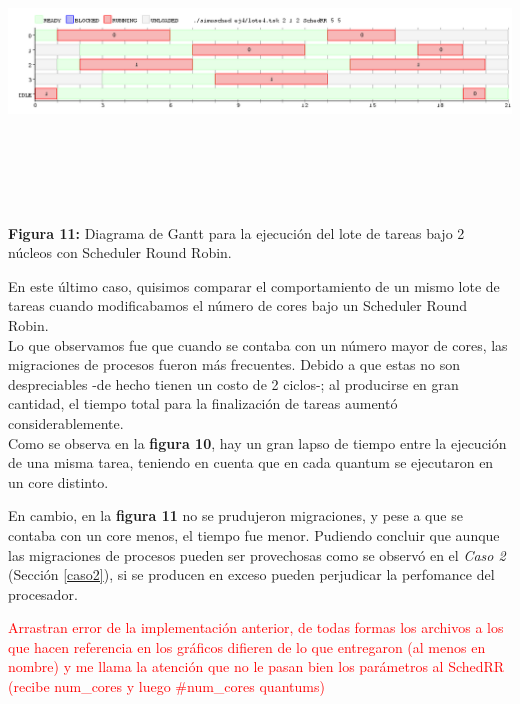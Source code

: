 \documentclass[a4paper]{article}
\begin{document}
 \includegraphics[width=\textwidth,height=3.0in,keepaspectratio]{imagenes/ej4/eje6.png} \\
\begin {flushleft}
\textbf{Figura 11:} Diagrama de Gantt para la ejecuci\'on del lote de tareas bajo 2 n\'ucleos con Scheduler Round Robin.
\end{flushleft}
 
\bigskip 

En este último caso, quisimos comparar el comportamiento de un mismo lote de tareas cuando modificabamos el número de cores bajo un Scheduler Round Robin.\\

 Lo que observamos fue que cuando se contaba con un número mayor de cores, las migraciones de procesos fueron m\'as frecuentes. Debido a que estas no son despreciables -de hecho tienen un costo de 2 ciclos-; al producirse en gran cantidad, el tiempo total para la finalización de tareas aumentó considerablemente. \\
 
 Como se observa en la \textbf{figura 10}, hay un gran lapso de tiempo entre la ejecución de una misma tarea, teniendo en cuenta que en cada quantum se ejecutaron en un core distinto. 
 
 En cambio, en la \textbf{figura 11} no se prudujeron migraciones, y pese a que se contaba con un core menos, el tiempo fue menor. Pudiendo concluir que aunque las migraciones de procesos pueden ser provechosas como se observó en el \emph{Caso 2} (Secci\'on \ref{caso2}), si se producen en exceso pueden perjudicar la perfomance del procesador.  

\textcolor{red}{Arrastran error de la implementación anterior, de todas formas los archivos a los que hacen referencia en los gráficos difieren de lo que entregaron (al menos en nombre) y me llama la atención que no le pasan bien los parámetros al SchedRR (recibe num_cores y luego \#num_cores quantums)}
\end{document}
